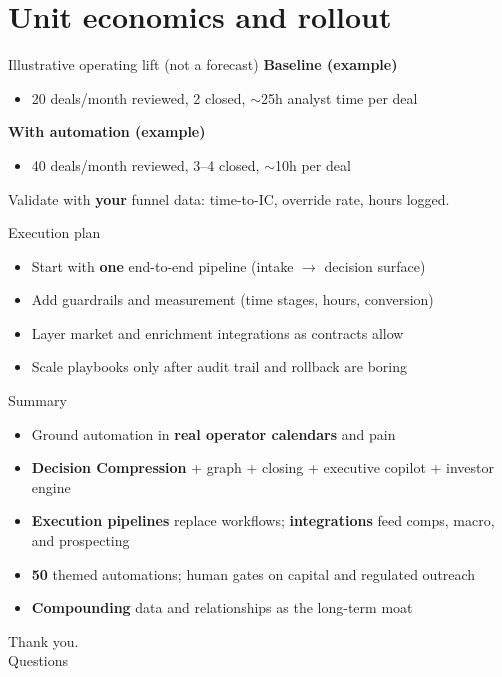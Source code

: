 \documentclass[aspectratio=169,11pt]{beamer}
\begin{document}
\section{Unit economics and rollout}

\begin{frame}{Illustrative operating lift (not a forecast)}
  \small
  \textbf{Baseline (example)}
  \begin{itemize}
    \item 20 deals/month reviewed, 2 closed, $\sim$25h analyst time per deal
  \end{itemize}
  \textbf{With automation (example)}
  \begin{itemize}
    \item 40 deals/month reviewed, 3--4 closed, $\sim$10h per deal
  \end{itemize}
  Validate with \textbf{your} funnel data: time-to-IC, override rate, hours logged.
\end{frame}

\begin{frame}{Execution plan}
  \small
  \begin{itemize}
    \item Start with \textbf{one} end-to-end pipeline (intake $\rightarrow$ decision surface)
    \item Add guardrails and measurement (time stages, hours, conversion)
    \item Layer market and enrichment integrations as contracts allow
    \item Scale playbooks only after audit trail and rollback are boring
  \end{itemize}
\end{frame}

\begin{frame}{Summary}
  \begin{itemize}
    \item Ground automation in \textbf{real operator calendars} and pain
    \item \textbf{Decision Compression} + graph + closing + executive copilot + investor engine
    \item \textbf{Execution pipelines} replace workflows; \textbf{integrations} feed comps, macro, and prospecting
    \item \textbf{50} themed automations; human gates on capital and regulated outreach
    \item \textbf{Compounding} data and relationships as the long-term moat
  \end{itemize}
\end{frame}

\begin{frame}
  \centering
  \Large Thank you.\\
  \vspace{1em}
  \normalsize Questions
\end{frame}
\end{document}
